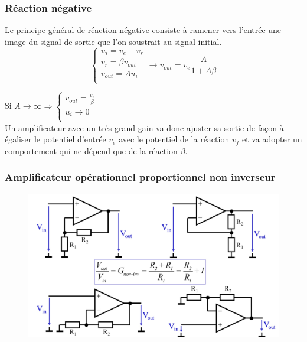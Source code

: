 \documentclass[../main.tex]{subfiles}
\begin{document}
\subsubsection{Réaction négative}
Le principe général de réaction négative consiste à ramener vers l'entrée une image du signal de sortie que l'on soustrait au signal initial.\\

\begin{equation}
\begin{cases}
    u_i = v_e - v_r\\
    v_r = \beta v_{out}\\
    v_{out} = Au_i\\
    \end{cases} \rightarrow v_{out} = v_e \frac{A}{1+A\beta}
\end{equation}

Si $A\rightarrow \infty \Rightarrow \begin{cases}
    v_{out} = \frac{v_e}{\beta}\\
    u_i \rightarrow 0\\
\end{cases}$\\

Un amplificateur avec un très grand gain va donc ajuster sa sortie de façon à égaliser le potentiel d'entrée $v_e$ avec le potentiel de la réaction $v_f$ et va adopter un comportement qui ne dépend que de la réaction $\beta$.\\

\subsubsection{Amplificateur opérationnel proportionnel non inverseur}

\begin{figure}[hbt!]
    \centering
    \includegraphics[width = .7\textwidth]{IMAGES/elec/IMG_0131.jpeg}
\end{figure}
\end{document}
